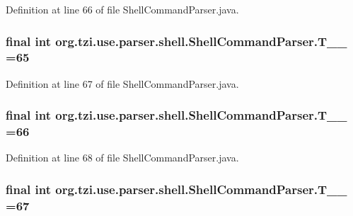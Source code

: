 Definition at line 66 of file Shell\-Command\-Parser.\-java.

\hypertarget{classorg_1_1tzi_1_1use_1_1parser_1_1shell_1_1_shell_command_parser_a6b2d63ce0ffd2912799942c144730dd4}{
\subsubsection[{T\-\_\-\-\_\-65}]{\setlength{\rightskip}{0pt plus 5cm}final int org.\-tzi.\-use.\-parser.\-shell.\-Shell\-Command\-Parser.\-T\-\_\-\-\_ =65\hspace{0.3cm}{\ttfamily [static]}}}\label{classorg_1_1tzi_1_1use_1_1parser_1_1shell_1_1_shell_command_parser_a6b2d63ce0ffd2912799942c144730dd4}


Definition at line 67 of file Shell\-Command\-Parser.\-java.

\hypertarget{classorg_1_1tzi_1_1use_1_1parser_1_1shell_1_1_shell_command_parser_a0e78c11d97e8917c53eaa1b13b032c53}{
\subsubsection[{T\-\_\-\-\_\-66}]{\setlength{\rightskip}{0pt plus 5cm}final int org.\-tzi.\-use.\-parser.\-shell.\-Shell\-Command\-Parser.\-T\-\_\-\-\_ =66\hspace{0.3cm}{\ttfamily [static]}}}\label{classorg_1_1tzi_1_1use_1_1parser_1_1shell_1_1_shell_command_parser_a0e78c11d97e8917c53eaa1b13b032c53}


Definition at line 68 of file Shell\-Command\-Parser.\-java.

\hypertarget{classorg_1_1tzi_1_1use_1_1parser_1_1shell_1_1_shell_command_parser_ad5ef8728530532ffc09a657c02f14155}{
\subsubsection[{T\-\_\-\-\_\-67}]{\setlength{\rightskip}{0pt plus 5cm}final int org.\-tzi.\-use.\-parser.\-shell.\-Shell\-Command\-Parser.\-T\-\_\-\-\_ =67\hspace{0.3cm}{\ttfamily [static]}}}\label{classorg_1_1tzi_1_1use_1_1parser_1_1shell_1_1_shell_command_parser_ad5ef8728530532ffc09a657c02f14155}


